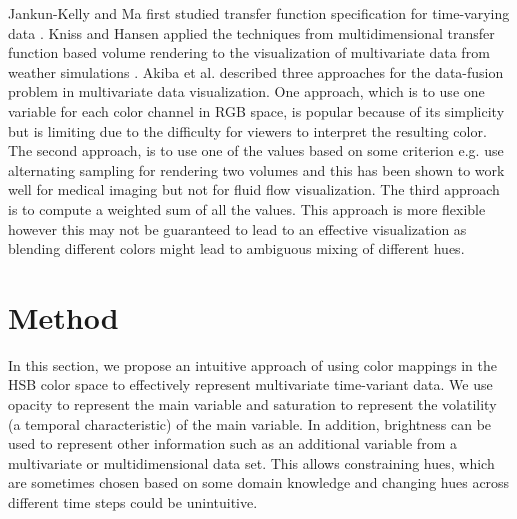 Jankun-Kelly and Ma first studied transfer function specification for time-varying data \cite{jankun-kelly_study_2001}.
Kniss and Hansen applied the techniques from multidimensional transfer function based volume rendering to the visualization of multivariate data from weather simulations \cite{kniss_volume_2002}.
Akiba et al. \cite{akiba_visualizing_2007} described three approaches for the data-fusion problem in multivariate data visualization.
One approach, which is to use one variable for each color channel in RGB space, is popular because of its simplicity but is limiting due to the difficulty for viewers to interpret the resulting color.
The second approach, is to use one of the values based on some criterion e.g. \cite{hastreiter_integrated_1998}
use alternating sampling for rendering two volumes and this has been shown to work well for medical imaging but not for fluid flow visualization.
The third approach is to compute a weighted sum of all the values. This approach is more flexible however this may not be guaranteed to lead to an effective visualization as blending different colors might lead to ambiguous mixing of different hues.



\section{Method}
In this section, we propose an intuitive approach of using color mappings in the HSB color space to effectively represent multivariate time-variant data. We use opacity to represent the main variable and saturation to represent the volatility (a temporal characteristic) of the main variable. In addition, brightness can be used to represent other information such as an additional variable from a multivariate or multidimensional data set. This allows constraining hues, which are sometimes chosen based on some domain knowledge and changing hues across different time steps could be unintuitive.

